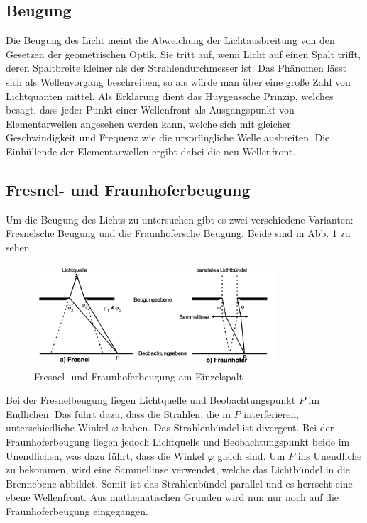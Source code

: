 \subsection{Beugung}
Die Beugung des Licht meint die Abweichung der Lichtausbreitung von den Gesetzen
der geometrischen Optik. Sie tritt auf, wenn Licht auf einen Spalt trifft, deren
Spaltbreite kleiner als der Strahlendurchmesser ist. Das Phänomen lässt sich
als Wellenvorgang beschreiben, so als würde man über eine große Zahl von
Lichtquanten mittel. Als Erklärung dient das Huygenssche Prinzip, welches besagt,
dass jeder Punkt einer Wellenfront als Ausgangspunkt von Elementarwellen angesehen
werden kann, welche sich mit gleicher Geschwindigkeit und Frequenz wie die ursprüngliche
Welle ausbreiten. Die Einhüllende der Elementarwellen ergibt dabei die neu
Wellenfront.\,\cite{leifi}

\subsection{Fresnel- und Fraunhoferbeugung}
Um die Beugung des Lichts zu untersuchen gibt es zwei verschiedene Varianten:
Fresnelsche Beugung und die Fraunhofersche Beugung. Beide sind in Abb. \ref{fig:FresUndFrau}
zu sehen.
\begin{figure}
  \centering
  \includegraphics[width=0.8\textwidth]{bilder/FresUndFrau.png}
  \caption{Fresnel- und Fraunhoferbeugung am Einzelspalt \cite{406}}
  \label{fig:FresUndFrau}
\end{figure}
Bei der Fresnelbeugung liegen Lichtquelle und Beobachtungspunkt $P$ im Endlichen.
Das führt dazu, dass die Strahlen, die in $P$ interferieren, unterschiedliche Winkel
$\varphi$ haben. Das Strahlenbündel ist divergent. Bei der Fraunhoferbeugung liegen jedoch
Lichtquelle und Beobachtungspunkt
beide im Unendlichen, was dazu führt, dass die Winkel $\varphi$ gleich sind.
Um $P$ ins Unendliche zu bekommen, wird eine Sammellinse verwendet, welche
das Lichtbündel in die Brennebene abbildet.
Somit ist das Strahlenbündel parallel und es herrscht eine ebene Wellenfront.
Aus mathematischen Gründen wird nun nur noch auf die Fraunhoferbeugung eingegangen.

